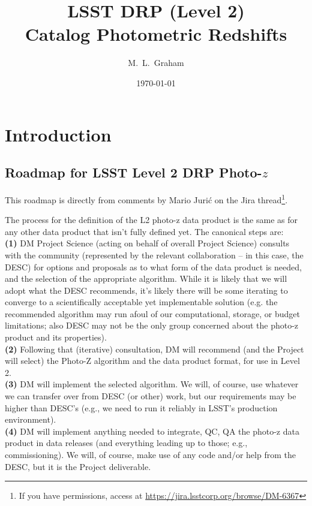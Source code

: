 \documentclass[DM,lsstdraft,toc]{lsstdoc}
\title[LSST Photo-$z$]{LSST DRP (Level 2) \\ Catalog Photometric Redshifts}
\author{M.~L.~Graham}
\date{\today}
\begin{document}
\maketitle




\section{Introduction} \label{sec:intro}

\subsection{Roadmap for LSST Level 2 DRP Photo-$z$}\label{ssec:intro_roadmap}

This roadmap is directly from comments by Mario Juri\'{c} on the Jira thread\footnote{If you have permissions, access at \url{https://jira.lsstcorp.org/browse/DM-6367}}.

The process for the definition of the L2 photo-z data product is the same as for any other data product that isn't fully defined yet. The canonical steps are: \\ {\bf (1)} DM Project Science (acting on behalf of overall Project Science) consults with the community (represented by the relevant collaboration -- in this case, the DESC) for options and proposals as to what form of the data product is needed, and the selection of the appropriate algorithm. While it is likely that we will adopt what the DESC recommends, it's likely there will be some iterating to converge to a scientifically acceptable yet implementable solution (e.g. the recommended algorithm may run afoul of our computational, storage, or budget limitations; also DESC may not be the only group concerned about the photo-z product and its properties). \\ {\bf (2)} Following that (iterative) consultation, DM will recommend (and the Project will select) the Photo-Z algorithm and the data product format, for use in Level 2. \\ {\bf (3)} DM will implement the selected algorithm. We will, of course, use whatever we can transfer over from DESC (or other) work, but our requirements may be higher than DESC's (e.g., we need to run it reliably in LSST's production environment). \\ {\bf (4)} DM will implement anything needed to integrate, QC, QA the photo-z data product in data releases (and everything leading up to those; e.g., commissioning). We will, of course, make use of any code and/or help from the DESC, but it is the Project deliverable.
\end{document}

